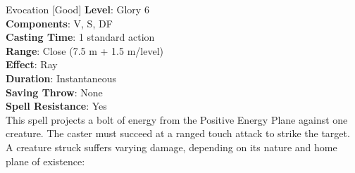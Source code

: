 {Evocation [Good]}
{
	\textbf{Level}: Glory 6\\
	\textbf{Components}: V, S, DF\\
	\textbf{Casting Time}: 1 standard action\\
	\textbf{Range}: Close (7.5 m + 1.5 m/level)\\
	\textbf{Effect}: Ray\\
	\textbf{Duration}: Instantaneous\\
	\textbf{Saving Throw}: None\\
	\textbf{Spell Resistance}: Yes\\
}
{
	This spell projects a bolt of energy from the Positive Energy Plane against one creature. The caster must succeed at a ranged touch attack to strike the target. A creature struck suffers varying damage, depending on its nature and home plane of existence:\\

}